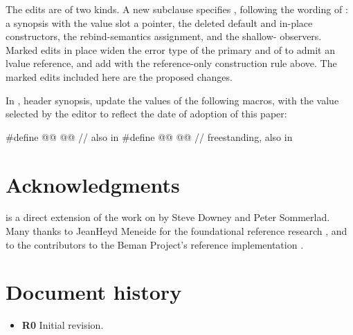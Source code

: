 \documentclass[a4paper,10pt,oneside,openany,final,article]{memoir}
\begin{document}
The \tcode{[expected]} edits are of two kinds. A new  subclause specifies
, following the  wording of
\cite{P2988R12}: a synopsis with the value slot a pointer, the deleted
default and in-place constructors, the rebind-semantics assignment, and the
shallow- observers. Marked edits in place widen the error type of
the primary  and of  to admit an
lvalue reference, and add  with the reference-only
construction rule above. The marked edits included here are the proposed
changes.

In , header  synopsis, update the values
of the following macros, with the value selected by the editor to reflect the
date of adoption of this paper:

\begin{codeblock}
#define @@               @@ // also in 
#define @@  @@ // freestanding, also in 
\end{codeblock}



\chapter{Acknowledgments}

 is a direct extension of the work on
 \cite{P2988R12} by Steve Downey and Peter Sommerlad. Many
thanks to JeanHeyd Meneide for the foundational reference research
\cite{P1683R0, REFBIND}, and to the contributors to the Beman Project's
 reference implementation \cite{Downey_beman_expected}.

\chapter*{Document history}

\begin{itemize}
\item \textbf{R0} Initial revision.
\end{itemize}

\renewcommand{\bibname}{References}


\end{document}
